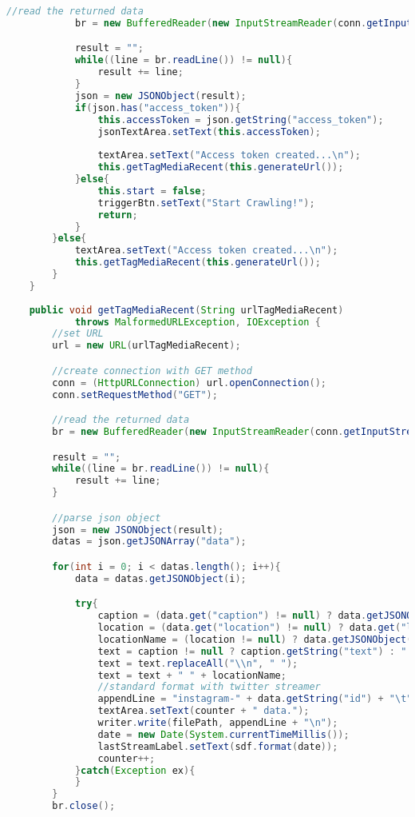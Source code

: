 \begin{lstlisting}[language=Java,basicstyle=\tiny,caption=InstagramCrawler.java]
            //read the returned data
            br = new BufferedReader(new InputStreamReader(conn.getInputStream()));

            result = "";
            while((line = br.readLine()) != null){
                result += line;
            }
            json = new JSONObject(result);
            if(json.has("access_token")){
                this.accessToken = json.getString("access_token");
                jsonTextArea.setText(this.accessToken); 
                
                textArea.setText("Access token created...\n");
                this.getTagMediaRecent(this.generateUrl());
            }else{
                this.start = false;
                triggerBtn.setText("Start Crawling!");
                return;
            }
        }else{
            textArea.setText("Access token created...\n");
            this.getTagMediaRecent(this.generateUrl());
        }
    }
    
    public void getTagMediaRecent(String urlTagMediaRecent) 
            throws MalformedURLException, IOException {
        //set URL
        url = new URL(urlTagMediaRecent);

        //create connection with GET method
        conn = (HttpURLConnection) url.openConnection();
        conn.setRequestMethod("GET");

        //read the returned data
        br = new BufferedReader(new InputStreamReader(conn.getInputStream()));

        result = "";
        while((line = br.readLine()) != null){
            result += line;
        }

        //parse json object
        json = new JSONObject(result);
        datas = json.getJSONArray("data");

        for(int i = 0; i < datas.length(); i++){
            data = datas.getJSONObject(i);

            try{
                caption = (data.get("caption") != null) ? data.getJSONObject("caption") : null;
                location = (data.get("location") != null) ? data.get("location").toString() : null;
                locationName = (location != null) ? data.getJSONObject("location").getString("name") : "";
                text = caption != null ? caption.getString("text") : " ";
                text = text.replaceAll("\\n", " ");
                text = text + " " + locationName;
                //standard format with twitter streamer
                appendLine = "instagram-" + data.getString("id") + "\t" + text + "\t instagram \t" + location + "\t" + data.getString("created_time") + "000\t";
                textArea.setText(counter + " data.");
                writer.write(filePath, appendLine + "\n");
                date = new Date(System.currentTimeMillis());
                lastStreamLabel.setText(sdf.format(date));
                counter++;
            }catch(Exception ex){
            }
        }
        br.close();


\end{lstlisting}
